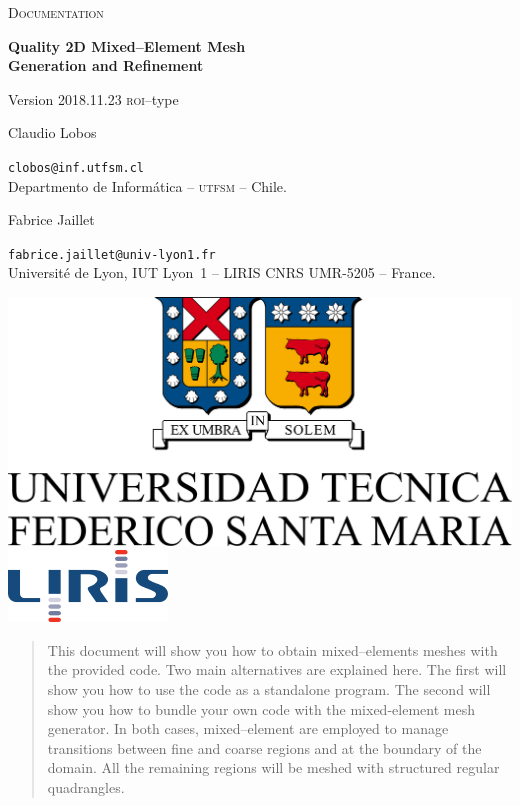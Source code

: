 \documentclass[10pt]{article}
\begin{document}
\begin{minipage}{0.7\textwidth}

{\LARGE \textsc{Documentation}}

{\Large \textbf{Quality 2D Mixed--Element Mesh\\ Generation and Refinement}

{\large Version 2018.11.23 \textsc{roi}--type}}

{\large Claudio Lobos}

\small \texttt{clobos@inf.utfsm.cl}\\
\small Departmento de Inform\'atica -- \textsc{utfsm}  -- Chile.

{\large Fabrice Jaillet}

\small \texttt{fabrice.jaillet@univ-lyon1.fr}\\
\small Universit\'e de Lyon, IUT Lyon~1 -- LIRIS CNRS UMR-5205  -- France.
\end{minipage}
\hfill
\begin{minipage}{0.28\textwidth}
\includegraphics[width=\textwidth]{utfsm-all-oc.pdf}
\includegraphics[width=\textwidth]{logo_liris_160_0.png}
\end{minipage}

\vspace{0.5cm}

\begin{abstract}
This document will show you how to obtain mixed--elements meshes with the provided code. Two main alternatives are explained here. The first will show you how to use the code as a standalone program. The second will show you how to bundle your own code with the mixed-element mesh generator. In both cases, mixed--element are employed to manage transitions between fine and coarse regions and at the boundary of the domain. All the remaining regions will be meshed with structured regular quadrangles.
\end{abstract}
\end{document}
